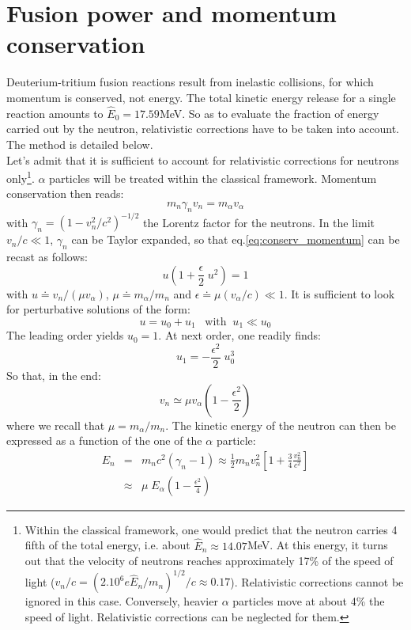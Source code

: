 \appendix
\section{Fusion power and momentum conservation}
\label{appendix:fusion_power}

Deuterium-tritium fusion reactions result from inelastic collisions, for which momentum is conserved, not energy. The total kinetic energy release for a single reaction amounts to $\hat E_0 = 17.59$MeV. So as to evaluate the fraction of energy carried out by the neutron, relativistic corrections have to be taken into account. The method is detailed below. \\

Let's admit that it is sufficient to account for relativistic corrections for neutrons only\footnote{Within the classical framework, one would predict that the neutron carries 4 fifth of the total energy, i.e. about $\hat E_n \approx 14.07$MeV. At this energy, it turns out that the velocity of neutrons reaches approximately 17\% of the speed of light ($v_n/c = (2.10^6e\hat E_n/m_n)^{1/2}/c \approx 0.17$). Relativistic corrections cannot be ignored in this case. Conversely, heavier $\alpha$ particles move at about 4\% the speed of light. Relativistic corrections can be neglected for them.}. $\alpha$ particles will be treated within the classical framework.
Momentum conservation then reads:
\begin{equation}
    m_n \gamma_n v_n = m_\alpha v_\alpha
    \label{eq:conserv_momentum}
\end{equation}
with $\gamma_n = (1-v_n^2/c^2)^{-1/2}$ the Lorentz factor for the neutrons. In the limit $v_n/c \ll1$,  $\gamma_n$ can be Taylor expanded, so that eq.\ref{eq:conserv_momentum} can be recast as follows:
\begin{equation}
    u \left( 1+\frac{\epsilon}{2}\; u^2 \right) 
    = 1
    \label{eq:conserv_momentum2}
\end{equation}
with $u \doteq v_n/(\mu v_\alpha)$, $\mu \doteq m_\alpha/m_n$ and $\epsilon \doteq \mu (v_\alpha/c)\ll1$. It is sufficient to look for perturbative solutions of the form: 
$$ u = u_0 + u_1 \;\;\; \textrm{with} \;\; u_1\ll u_0 $$
The leading order yields $u_0=1$. At next order, one readily finds:
$$ u_1 = -\frac{\epsilon^2}{2} \; u_0^3 $$
So that, in the end:
\begin{equation*}
    v_n \simeq \mu v_\alpha \left( 1-\frac{\epsilon^2}{2}\right)
\end{equation*}
where we recall that $\mu=m_\alpha/m_n$.
The kinetic energy of the neutron can then be expressed as a function of the one of the $\alpha$ particle:
\begin{eqnarray*}
    E_n &=& m_nc^2(\gamma_n-1) \approx 
    \frac{1}{2} m_nv_n^2\left[ 1+ \frac{3}{4}\frac{v_n^2}{c^2}\right] \nonumber \\
    &\approx& \mu\; E_\alpha \left( 1-\frac{\epsilon^2}{4}\right)
\end{eqnarray*}

